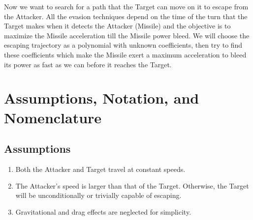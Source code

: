 	
	 
	 
	
	



Now we want to search for a path that the Target can move on it to escape from the Attacker. All the evasion techniques depend on the time of the turn that the Target makes when it detects the Attacker (Missile) and the objective is to maximize the Missile acceleration till the Missile power bleed. 
We will  choose the escaping trajectory as a polynomial with unknown coefficients, then try to find these coefficients which make the Missile exert a maximum acceleration to bleed its power as fast as we can before it reaches the Target.  
\section{Assumptions, Notation, and Nomenclature}
\subsection*{Assumptions}

\begin{enumerate}
	\item Both the Attacker and Target travel at constant speeds.
	\item The Attacker's speed is larger than that of the Target. Otherwise, the Target will be unconditionally or trivially capable of escaping. 
	\item Gravitational and drag effects are neglected for simplicity.
\end{enumerate}


